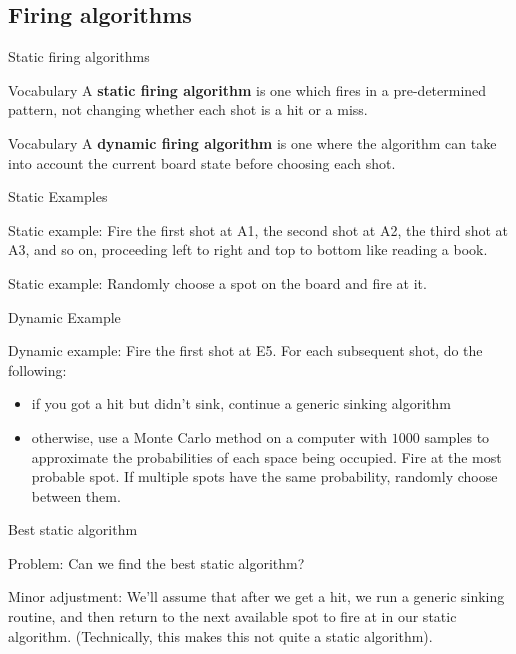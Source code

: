 \documentclass{beamer}
\begin{document}
\subsection{Firing algorithms}

\begin{frame}{Static firing algorithms}
\pause
  \begin{block}{Vocabulary}
	A \textbf{static firing algorithm} is one which fires in a pre-determined
    pattern, not changing whether each shot is a hit or a miss.
  \end{block}
\pause
  \begin{block}{Vocabulary}
	A \textbf{dynamic firing algorithm} is one where the algorithm can take into account the current board state before choosing each shot.
  \end{block}
\end{frame}

\begin{frame}{Static Examples}
\pause
  \begin{block}{Static example:}
    Fire the first shot at A1, the second shot at A2, the third shot at A3, and so on, proceeding left to right and top to bottom like reading a book.
  \end{block}
\pause
  \begin{block}{Static example:}
    Randomly choose a spot on the board and fire at it.
  \end{block}
\end{frame}

\begin{frame}{Dynamic Example}
  \begin{block}{Dynamic example:}
    Fire the first shot at E5.  For each subsequent shot, do the following:
    \begin{itemize}
      \item if you got a hit but didn't sink, continue a generic sinking algorithm
      \item otherwise, use a Monte Carlo method on a computer with $1000$ samples to approximate the probabilities of each space being occupied.  Fire at the most probable spot.  If multiple spots have the same probability, randomly choose between them.
    \end{itemize}
  \end{block}
\end{frame}


\begin{frame}{Best static algorithm}
\pause
  \begin{block}{Problem:}
    Can we find the best static algorithm?
  \end{block}
\pause
  \begin{block}{Minor adjustment:}
    We'll assume that after we get a hit, we run a generic sinking routine, and then return to the next available spot to fire at in our static algorithm.  (Technically, this makes this not quite a static algorithm).
  \end{block}
\end{frame}
\end{document}
